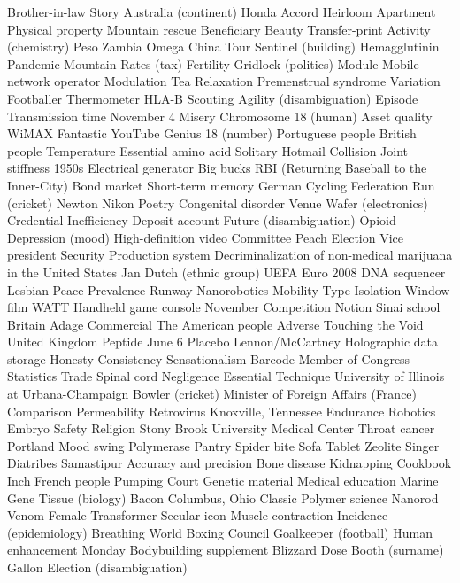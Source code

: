 Brother-in-law  Story  Australia (continent)  
Honda Accord  Heirloom  Apartment  
Physical property  Mountain rescue  Beneficiary  
Beauty  Transfer-print  Activity (chemistry)  
Peso  Zambia  Omega China Tour  
Sentinel (building)  Hemagglutinin  Pandemic  
Mountain  Rates (tax)  Fertility  
Gridlock (politics)  Module  Mobile network operator  
Modulation  Tea  Relaxation  
Premenstrual syndrome  Variation  Footballer  
Thermometer  HLA-B  Scouting  
Agility (disambiguation)  Episode  Transmission time  
November 4  Misery  Chromosome 18 (human)  
Asset quality  WiMAX  Fantastic  
YouTube  Genius  18 (number)  
Portuguese people  British people  Temperature  
Essential amino acid  Solitary  Hotmail  
Collision  Joint stiffness  1950s  
Electrical generator  Big bucks  RBI (Returning Baseball to the Inner-City)  
Bond market  Short-term memory  German Cycling Federation  
Run (cricket)  Newton  Nikon  
Poetry  Congenital disorder  Venue  
Wafer (electronics)  Credential  Inefficiency  
Deposit account  Future (disambiguation)  Opioid  
Depression (mood)  High-definition video  Committee  
Peach  Election  Vice president  
Security  Production system  Decriminalization of non-medical marijuana in the United States  
Jan  Dutch (ethnic group)  UEFA Euro 2008  
DNA sequencer  Lesbian  Peace  
Prevalence  Runway  Nanorobotics  
Mobility  Type  Isolation  
Window film  WATT  Handheld game console  
November  Competition  Notion  
Sinai school  Britain  Adage  
Commercial  The American people  Adverse  
Touching the Void  United Kingdom  Peptide  
June 6  Placebo  Lennon/McCartney  
Holographic data storage  Honesty  Consistency  
Sensationalism  Barcode  Member of Congress  
Statistics  Trade  Spinal cord  
Negligence  Essential  Technique  
University of Illinois at Urbana-Champaign  Bowler (cricket)  Minister of Foreign Affairs (France)  
Comparison  Permeability  Retrovirus  
Knoxville, Tennessee  Endurance  Robotics  
Embryo  Safety  Religion  
Stony Brook University Medical Center  Throat cancer  Portland  
Mood swing  Polymerase  Pantry  
Spider bite  Sofa  Tablet  
Zeolite  Singer  Diatribes  
Samastipur  Accuracy and precision  Bone disease  
Kidnapping  Cookbook  Inch  
French people  Pumping  Court  
Genetic material  Medical education  Marine  
Gene  Tissue (biology)  Bacon  
Columbus, Ohio  Classic  Polymer science  
Nanorod  Venom  Female  
Transformer  Secular icon  Muscle contraction  
Incidence (epidemiology)  Breathing  World Boxing Council  
Goalkeeper (football)  Human enhancement  Monday  
Bodybuilding supplement  Blizzard  Dose  
Booth (surname)  Gallon  Election (disambiguation)  
